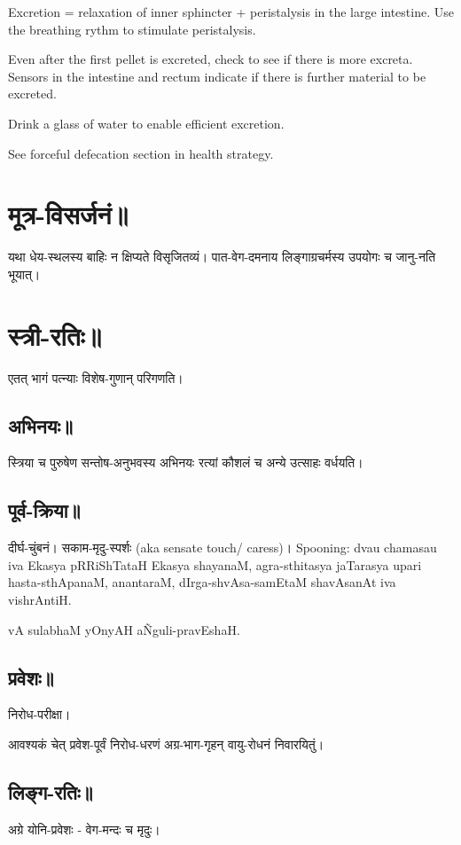 \documentclass[oneside, article]{memoir}
\begin{document}
Excretion = relaxation of inner sphincter + peristalysis in the large intestine. Use the breathing rythm to stimulate peristalysis.

Even after the first pellet is excreted, check to see if there is more excreta. Sensors in the intestine and rectum indicate if there is further material to be excreted.

Drink a  glass of water to enable efficient excretion.

See forceful defecation section in health strategy.

\chapter{मूत्र-विसर्जनं॥}
यथा धेय-स्थलस्य बाहिः न क्षिप्यते विसृजितव्यं। पात-वेग-दमनाय लिङ्गाग्रचर्मस्य उपयोगः च जानु-नति भूयात्।

\chapter{स्त्री-रतिः॥}
एतत् भागं पत्न्याः विशेष-गुणान् परिगणति।

\section{अभिनयः॥}
स्त्रिया च पुरुषेण सन्तोष-अनुभवस्य अभिनयः रत्यां कौशलं च अन्ये उत्साहः वर्धयति।

\section{पूर्व-क्रिया॥}
दीर्घ-चुंबनं। सकाम-मृदु-स्पर्शः (aka sensate touch/ caress)। Spooning: dvau chamasau iva Ekasya pRRiShTataH Ekasya shayanaM, agra-sthitasya jaTarasya upari hasta-sthApanaM, anantaraM, dIrga-shvAsa-samEtaM shavAsanAt iva vishrAntiH.

vA sulabhaM yOnyAH a\~Nguli-pravEshaH.

\section{प्रवेशः॥}
निरोध-परीक्षा।

आवश्यकं चेत् प्रवेश-पूर्वं निरोध-धरणं अग्र-भाग-गृहन् वायु-रोधनं निवारयितुं।

\section{लिङ्ग-रतिः॥}
अग्रे योनि-प्रवेशः - वेग-मन्दः च मृदुः।
\end{document}
